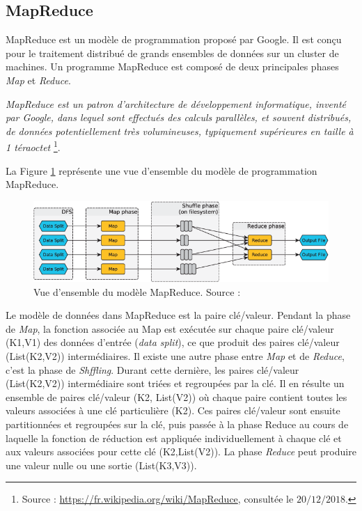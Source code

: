 \subsection{MapReduce} \label{mapreducesection}

MapReduce est un modèle de programmation proposé par Google. Il est conçu pour   le traitement distribué de grands ensembles de données   sur un cluster de machines. Un programme MapReduce est composé de deux principales phases  \textit{Map} et  \textit{Reduce}.
\begin{tcolorbox}
	\textit{ MapReduce est un patron d'architecture de développement informatique, inventé par Google, dans lequel sont effectués des calculs parallèles, et souvent distribués, de données potentiellement très volumineuses, typiquement supérieures en taille à 1 téraoctet} \footnote{Source : \url{https://fr.wikipedia.org/wiki/MapReduce}, consultée le $20/12/2018$.}. 
\end{tcolorbox}
La Figure 	\ref{fig:2-figure1-1-map-reduce-workflow} représente une vue d'ensemble du modèle de programmation MapReduce. 

\begin{figure}[h]
	\centering
	\includegraphics[width=\linewidth]{illustrations/2-Figure1-1-map-reduce-workflow}
	\caption{Vue d'ensemble du modèle MapReduce. Source : \cite{6427487}}
	\label{fig:2-figure1-1-map-reduce-workflow}
\end{figure}


Le modèle de données dans MapReduce est la paire clé/valeur. Pendant la phase de \textit{Map}, la fonction  associée  au Map est exécutée sur chaque paire clé/valeur (K1,V1) des données d'entrée (\textit{data split}), ce que produit   des paires clé/valeur (List(K2,V2)) intermédiaires. Il existe une autre phase entre  \textit{Map} et de \textit{Reduce}, c'est la phase de \textit{Shffling}. Durant cette dernière,  les paires clé/valeur (List(K2,V2))  intermédiaire sont triées et regroupées par la clé. Il en résulte un ensemble de paires clé/valeur (K2, List(V2)) où chaque paire contient toutes les valeurs associées à une clé particulière (K2). Ces paires clé/valeur sont ensuite partitionnées et regroupées sur la clé, puis passée à la phase Reduce au cours de laquelle la fonction de réduction est appliquée individuellement à chaque clé et aux valeurs associées pour cette clé (K2,List(V2)). La phase \textit{Reduce} peut produire une valeur nulle ou une sortie (List(K3,V3)).

